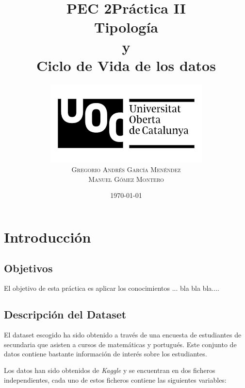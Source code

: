 \documentclass[12pt,a4paper]{article}
\title{PEC 2}
\title{Práctica II\\Tipología \\ y \\Ciclo de Vida de los datos \\} %
\author{%
		\protect\includegraphics[trim = 0mm 0mm 0mm 0mm, clip,scale=0.3]{images/uoc}\\ %
	\textsc{Gregorio Andrés García Menéndez} \\ %
	\textsc{ Manuel Gómez Montero}
}
\date{\today} %
\begin{document}
	\nocite{*}
	\maketitle
\tableofcontents
\clearpage

\section{Introducción}

\subsection{Objetivos}
El objetivo de esta práctica es aplicar los conocimientos ... bla bla bla.... 


\subsection{Descripción del Dataset}
El dataset escogido ha sido obtenido a través de una encuesta de estudiantes de secundaria que asisten a cursos de matemáticas y  portugués. Este conjunto de datos contiene bastante información de interés sobre los estudiantes. 

Los datos han sido obtenidos de \textit{Kaggle} y se encuentran en dos ficheros independientes, cada uno de estos ficheros contiene las siguientes variables: 
\end{document}

